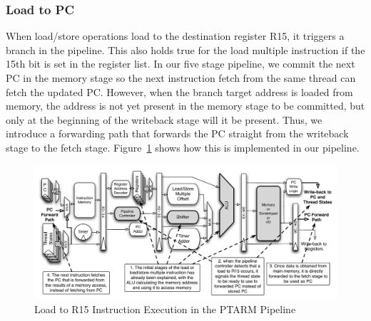 \subsubsection{Load to PC}    
When load/store operations load to the destination register R15, it triggers a branch in the pipeline.
This also holds true for the load multiple instruction if the 15th bit is set in the register list.
In our five stage pipeline, we commit the next PC in the memory stage so the next instruction fetch from the same thread can fetch the updated PC.
However, when the branch target address is loaded from memory, the address is not yet present in the memory stage to be committed, but only at the beginning of the writeback stage will it be present. 
Thus, we introduce a forwarding path that forwards the PC straight from the writeback stage to the fetch stage. 
Figure~\ref{fig:ld_to_pc_pipeline_implementation} shows how this is implemented in our pipeline.   
\begin{figure}[h]
  \vspace{-15pt}
  \begin{center}
    \includegraphics[scale=.54]{figs/ld_to_pc_pipeline_implementation}
  \end{center}
  \vspace{-3mm}
  \caption{Load to R15 Instruction Execution in the PTARM Pipeline}
  \label{fig:ld_to_pc_pipeline_implementation}
\end{figure}

